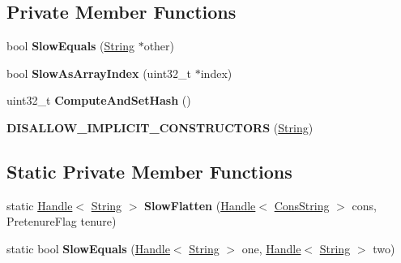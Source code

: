 \subsection*{Private Member Functions}
\begin{DoxyCompactItemize}
\item 
bool {\bfseries Slow\+Equals} (\hyperlink{classv8_1_1internal_1_1_string}{String} $\ast$other)\hypertarget{classv8_1_1internal_1_1_string_a6e2e4cdb5aca41706ffd548cebbfa5a5}{}\label{classv8_1_1internal_1_1_string_a6e2e4cdb5aca41706ffd548cebbfa5a5}

\item 
bool {\bfseries Slow\+As\+Array\+Index} (uint32\+\_\+t $\ast$index)\hypertarget{classv8_1_1internal_1_1_string_a587d641f7ef999595c8cde0615af1896}{}\label{classv8_1_1internal_1_1_string_a587d641f7ef999595c8cde0615af1896}

\item 
uint32\+\_\+t {\bfseries Compute\+And\+Set\+Hash} ()\hypertarget{classv8_1_1internal_1_1_string_a5fd4138cd7e09bde619c795af47d3b75}{}\label{classv8_1_1internal_1_1_string_a5fd4138cd7e09bde619c795af47d3b75}

\item 
{\bfseries D\+I\+S\+A\+L\+L\+O\+W\+\_\+\+I\+M\+P\+L\+I\+C\+I\+T\+\_\+\+C\+O\+N\+S\+T\+R\+U\+C\+T\+O\+RS} (\hyperlink{classv8_1_1internal_1_1_string}{String})\hypertarget{classv8_1_1internal_1_1_string_ab06e016ba3a4e0ad458b9c6af56f5d38}{}\label{classv8_1_1internal_1_1_string_ab06e016ba3a4e0ad458b9c6af56f5d38}

\end{DoxyCompactItemize}
\subsection*{Static Private Member Functions}
\begin{DoxyCompactItemize}
\item 
static \hyperlink{classv8_1_1internal_1_1_handle}{Handle}$<$ \hyperlink{classv8_1_1internal_1_1_string}{String} $>$ {\bfseries Slow\+Flatten} (\hyperlink{classv8_1_1internal_1_1_handle}{Handle}$<$ \hyperlink{classv8_1_1internal_1_1_cons_string}{Cons\+String} $>$ cons, Pretenure\+Flag tenure)\hypertarget{classv8_1_1internal_1_1_string_a22130e5c8713bcc0d4508166d641b406}{}\label{classv8_1_1internal_1_1_string_a22130e5c8713bcc0d4508166d641b406}

\item 
static bool {\bfseries Slow\+Equals} (\hyperlink{classv8_1_1internal_1_1_handle}{Handle}$<$ \hyperlink{classv8_1_1internal_1_1_string}{String} $>$ one, \hyperlink{classv8_1_1internal_1_1_handle}{Handle}$<$ \hyperlink{classv8_1_1internal_1_1_string}{String} $>$ two)\hypertarget{classv8_1_1internal_1_1_string_aff9dbf74598d8769ce168f6b27424b15}{}\label{classv8_1_1internal_1_1_string_aff9dbf74598d8769ce168f6b27424b15}

\end{DoxyCompactItemize}
